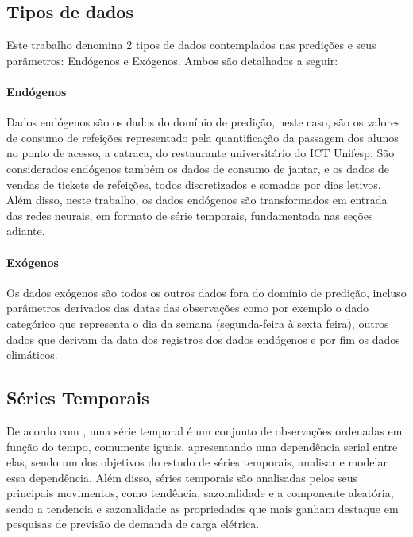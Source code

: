 \subsection{Tipos de dados}
  
Este trabalho denomina 2 tipos de dados contemplados nas predições e seus parâmetros: 
Endógenos e Exógenos. Ambos são detalhados a seguir:
            
\paragraph{Endógenos}
Dados endógenos são os dados do domínio de predição, neste caso, são os valores de consumo de refeições representado pela quantificação da passagem dos alunos no ponto de acesso, a catraca, do restaurante universitário do ICT Unifesp.
São considerados endógenos também os dados de consumo de jantar, e os dados de vendas de tickets de refeições, todos discretizados e somados por dias letivos. Além disso, neste trabalho, os dados endógenos são transformados em entrada das redes neurais, em formato de série temporais, fundamentada nas seções adiante.
            
\paragraph{Exógenos}
Os dados exógenos são todos os outros dados fora do domínio de predição, incluso parâmetros derivados das datas das observações como por exemplo o dado categórico que representa o dia da semana (segunda-feira à sexta feira), outros dados que derivam da data dos registros dos dados endógenos e por fim os dados climáticos.
          
          
\subsection{Séries Temporais}


De acordo com  , uma série temporal é um conjunto de observações ordenadas em função do tempo, comumente iguais, apresentando uma dependência serial entre elas, sendo um dos objetivos do estudo de séries temporais, analisar e modelar essa dependência. Além disso, séries temporais são analisadas pelos seus principais movimentos, como tendência, sazonalidade e a componente aleatória, sendo a tendencia e sazonalidade as propriedades que mais ganham destaque em pesquisas de previsão de demanda de carga elétrica.

